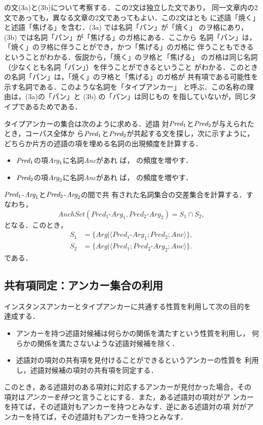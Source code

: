 \documentclass[japanese]{jnlp_1.4}
\begin{document}
の文(3a)と(3b)について考察する．この2文は独立した文であり，
同一文章内の2文であっても，異なる文章の2文であってもよい．この2文はとも
に述語「焼く」と述語「焦げる」を含む．(3a) では名詞「パン」が「焼く」
のヲ格にあり，(3b) では名詞「パン」が「焦げる」のガ格にある．ここから
名詞「パン」は，「焼く」のヲ格に伴うことができ，かつ「焦げる」のガ格に
伴うこともできるということがわかる．仮説から，「焼く」のヲ格と「焦げる」
のガ格は同じ名詞（少なくとも名詞「パン」）を伴うことができるということ
がわかる．このときの名詞「パン」は，「焼く」のヲ格と「焦げる」のガ格が
共有項である可能性を示す名詞である．このような名詞を「タイプアンカー」
と呼ぶ．この名称の理由は，(3a)の「パン」と (3b) の「パン」は同じもの
を指していないが，同じタイプであるためである．

タイプアンカーの集合は次のように求める．述語
対$\emph{Pred}_1$と$\emph{Pred}_2$が与えられたとき，コーパス全体か
ら$\emph{Pred}_1$と$\emph{Pred}_2$が共起する文を探し，次に示すように，
どちらか片方の述語の項を埋める名詞の出現頻度を計算する．
\begin{itemize}
\item $\emph{Pred}_1$の項$\emph{Arg}_1$に名詞\emph{Anc}があれ
  ば， の頻度を増やす．
\item $\emph{Pred}_2$の項$\emph{Arg}_2$に名詞\emph{Anc}があれ
  ば， の頻度を増やす．
\end{itemize}
$\emph{Pred}_1$-$\emph{Arg}_1$と$\emph{Pred}_2$-$\emph{Arg}_2$の間で共
有された名詞集合の交差集合を計算する．すなわち，
\[
 \mathit{AnchSet}(\mathit{Pred}_1\text{-}\mathit{Arg}_1, \mathit{Pred}_2\text{-}\mathit{Arg}_2)
  = S_1\cap S_2,
\]
となる．このとき，
\begin{align*}
 S_1 & =\{\mathit{Arg}|\langle\mathit{Pred}_1\text{-}\mathit{Arg}_1; 
	\mathit{Pred}_2; \mathit{Anc}\rangle\},\\
 S_2 & =\{\mathit{Arg}|\langle\mathit{Pred}_1; \mathit{Pred}_2\text{-}\mathit{Arg}_2; \mathit{Anc}\rangle\}.
\end{align*}
である．



\subsection{共有項同定：アンカー集合の利用}

インスタンスアンカーとタイプアンカーに共通する性質を利用して次の目的を
達成する．
\begin{itemize}
\item アンカーを持つ述語対候補は何らかの関係を満たすという性質を利用し，
  何らかの関係を満たさないような述語対候補を除く．
\item 述語対の項対の共有項を見付けることができるというアンカーの性質を
  利用し，述語対候補の項対の共有項を同定する．
\end{itemize}
このとき，ある述語対のある項対に対応するアンカーが見付かった場合，その
項対は\emph{アンカーを持つ}と言うことにする．また，ある述語対の項対がア
ンカーを持てば，その述語対もアンカーを持つとみなす．逆にある述語対の項
対がアンカーを持てば，その述語対もアンカーを持つとみなす．
\end{document}
